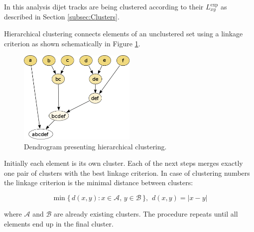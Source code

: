 
In this analysis dijet tracks are being clustered according to 
their $L_{xy}^\text{exp}$ as described in Section \ref{subsec:Clusters}.

Hierarchical clustering connects elements of an unclustered set using a linkage criterion
as shown schematically in Figure \ref{fig:dendrogram}.
\begin{figure}[htbp]
\centering
\includegraphics[width=0.5\textwidth]{plots/dendrogram.png}
\caption{Dendrogram presenting hierarchical clustering. \label{fig:dendrogram}}
\end{figure}

 Initially each element is its own cluster. Each of the next steps merges exactly one pair of clusters 
with the best linkage criterion. In case of clustering numbers the linkage criterion is the minimal distance 
between clusters:

\[
\min \{\, d(x,y) : x \in \mathcal{A},\, y \in \mathcal{B} \,\}, \hspace{5pt} d(x,y)=|x-y| 
\]   

where $\mathcal{A}$ and $\mathcal{B}$ are already existing clusters. 
The procedure repeats until all elements end up
in the final cluster.   
